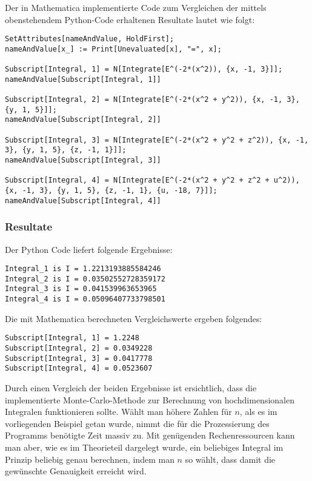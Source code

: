 \documentclass[a4paper,12pt]{article}
\begin{document}
Der in Mathematica implementierte Code zum Vergleichen der mittels obenstehendem Python-Code erhaltenen Resultate lautet wie folgt:

\begin{Verbatim}[breaklines = true, breakanywhere = true]
SetAttributes[nameAndValue, HoldFirst]; 
nameAndValue[x_] := Print[Unevaluated[x], "=", x];

Subscript[Integral, 1] = N[Integrate[E^(-2*(x^2)), {x, -1, 3}]];
nameAndValue[Subscript[Integral, 1]]

Subscript[Integral, 2] = N[Integrate[E^(-2*(x^2 + y^2)), {x, -1, 3}, {y, 1, 5}]];
nameAndValue[Subscript[Integral, 2]]

Subscript[Integral, 3] = N[Integrate[E^(-2*(x^2 + y^2 + z^2)), {x, -1, 3}, {y, 1, 5}, {z, -1, 1}]];
nameAndValue[Subscript[Integral, 3]]

Subscript[Integral, 4] = N[Integrate[E^(-2*(x^2 + y^2 + z^2 + u^2)), {x, -1, 3}, {y, 1, 5}, {z, -1, 1}, {u, -18, 7}]];
nameAndValue[Subscript[Integral, 4]]
\end{Verbatim}

\subsubsection{Resultate}
Der Python Code liefert folgende Ergebnisse:
\begin{Verbatim}[breaklines = true, breakanywhere = true]
Integral_1 is I = 1.2213193885584246
Integral_2 is I = 0.03502552728359172
Integral_3 is I = 0.041539963653965
Integral_4 is I = 0.05096407733798501
\end{Verbatim}

Die mit Mathematica berechneten Vergleichswerte ergeben folgendes:
\begin{Verbatim}[breaklines = true, breakanywhere = true]
Subscript[Integral, 1] = 1.2248
Subscript[Integral, 2] = 0.0349228
Subscript[Integral, 3] = 0.0417778
Subscript[Integral, 4] = 0.0523607
\end{Verbatim}

Durch einen Vergleich der beiden Ergebnisse ist ersichtlich, dass die implementierte Monte-Carlo-Methode zur Berechnung von hochdimensionalen Integralen funktionieren sollte. Wählt man höhere Zahlen für $n$, als es im vorliegenden Beispiel getan wurde, nimmt die für die Prozessierung des Programms benötigte Zeit massiv zu. Mit genügenden Rechenressourcen kann man aber, wie es im Theorieteil dargelegt wurde, ein beliebiges Integral im Prinzip beliebig genau berechnen, indem man $n$ so wählt, dass damit die gewünschte Genauigkeit erreicht wird.



\end{document}
